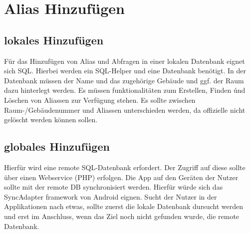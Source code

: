 \newpage
\section{Alias Hinzufügen}

\subsection{lokales Hinzufügen}

Für das Hinzufügen von Alias und Abfragen in einer lokalen Datenbank eignet sich SQL. Hierbei werden
ein SQL-Helper und eine Datenbank benötigt. In der Datenbank müssen der Name und das zugehörige Gebäude und ggf. 
der Raum dazu hinterlegt werden. Es müssen funktionalitäten zum Erstellen, Finden únd Löschen von Aliassen zur Verfügung stehen.
Es sollte zwischen Raum-/Gebäudenummer und Aliassen unterschieden werden, da offizielle nicht gelöscht werden können sollen.

\subsection{globales Hinzufügen}

Hierfür wird eine remote SQL-Datenbank erfordert. Der Zugriff auf diese sollte über einen Webservice (PHP) erfolgen.
Die App auf den Geräten der Nutzer sollte mit der remote DB synchronisiert werden. Hierfür würde sich das SyncAdapter framework
von Android eignen. Sucht der Nutzer in der Applikationen nach etwas, sollte zuerst die lokale Datenbank dursucht werden und 
erst im Anschluss, wenn das Ziel noch nicht gefunden wurde, die remote Datenbank.